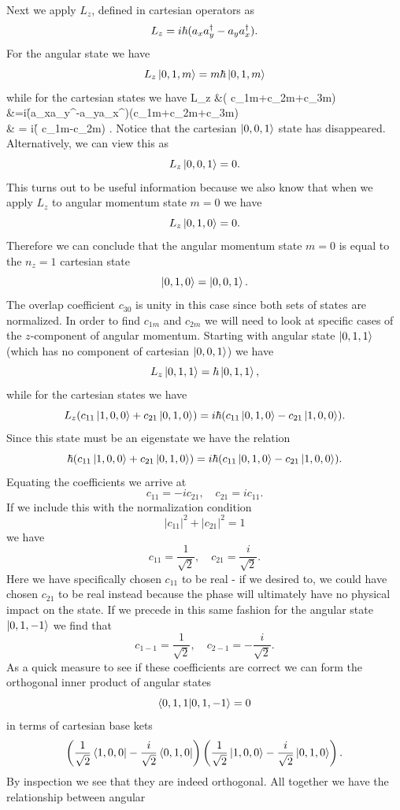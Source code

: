 \documentclass[11pt,letterpaper]{article}
\begin{document}
	Next we apply $L_z$, defined in cartesian operators as
	\[
		L_z = i\hbar(a_xa_y^\dag-a_ya_x^\dag).
	\]
	For the angular state we have
	\[
		L_z\ket{0,1,m} = m\hbar\ket{0,1,m} 
	\]
	while for the cartesian states we have
	\ba
		L_z &( c_{1m}+c_{2m}+c_{3m}) \\
		&=i\h(a_xa_y^\dag-a_ya_x^\dag)(c_{1m}+c_{2m}+c_{3m})\\
		& = i\h( c_{1m}-c_{2m}) .
	\ea
	Notice that the cartesian $\ket{0,0,1}$ state has disappeared. Alternatively, we can view this as
	\[
		L_z\ket{0,0,1} = 0.
	\]
	This turns out to be useful information because we also know that when we apply $L_z$ to angular momentum state $m=0$
	we have
	\[
		L_z\ket{0,1,0} = 0.
	\]
	Therefore we can conclude that the angular momentum state $m=0$ is equal to the $n_z=1$ cartesian state
	\[
		\ket{0,1,0} = \ket{0,0,1}.
	\]
	The overlap coefficient $c_{30}$ is unity in this case since both sets of states are normalized. In order to find $c_{1m}$ and
	$c_{2m}$ we will need to look at specific cases of the $z$-component of angular momentum. Starting with angular state
	$\ket{0,1,1}$ (which has no component of cartesian $\ket{0,0,1}$) we have
	\[
		L_z\ket{0,1,1} = \hbar\ket{0,1,1},
	\]
	while for the cartesian states we have
	\[
		L_z( c_{11}\ket{1,0,0}+c_{21}\ket{0,1,0}) = i\hbar( c_{11}\ket{0,1,0}-c_{21}\ket{1,0,0}) .
	\]
	Since this state must be an eigenstate we have the relation
	\[
		\hbar(c_{11}\ket{1,0,0}+c_{21}\ket{0,1,0}) = i\hbar(c_{11}\ket{0,1,0}-c_{21}\ket{1,0,0}).
	\]
	Equating the coefficients we arrive at
	\[
		c_{11} = -ic_{21},\quad c_{21} = ic_{11}.
	\]
	If we include this with the normalization condition
	\[
		|c_{11}|^2+|c_{21}|^2 = 1
	\]
	we have
	\[
		c_{11} = \frac{1}{\sqrt 2},\quad c_{21} = \frac{i}{\sqrt 2}.
	\]
	Here we have specifically chosen $c_{11}$ to be real - if we desired to, we could have chosen $c_{21}$ to be real instead because 
	the phase will ultimately have no physical impact on the state. If we precede in this same fashion for the angular state
	$\ket{0,1,-1}$ we find that
	\[
		c_{1-1} = \frac{1}{\sqrt 2},\quad c_{2-1} = -\frac{i}{\sqrt 2}.
	\]
	As a quick measure to see if these coefficients are correct we can form the orthogonal inner product of angular states
	\[
		\braket{0,1,1|0,1,-1} = 0
	\]
	in terms of cartesian base kets
	\[
		\left(\frac{1}{\sqrt 2}\bra{1,0,0}-\frac{i}{\sqrt 2}\bra{0,1,0}\right)\left(\frac{1}{\sqrt 2}\ket{1,0,0}-\frac{i}{\sqrt 2}\ket{0,1,0}\right).
	\]
	By inspection we see that they are indeed orthogonal. All together we have the relationship between angular
\end{document}
